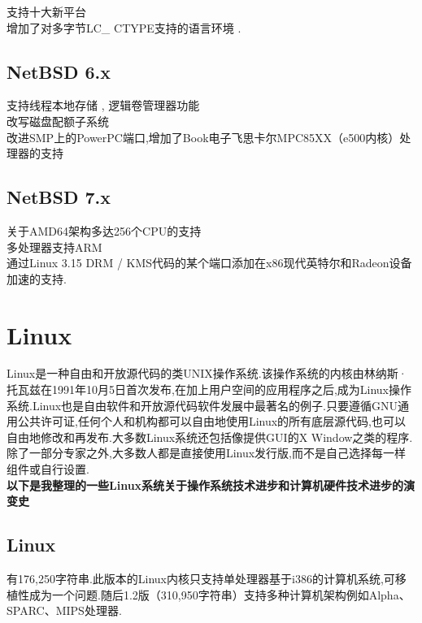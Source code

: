 \documentclass[a4paper,12pt,notitlepage]{article}
\begin{document}
	支持十大新平台 \\
	
	增加了对多字节LC\_ CTYPE支持的语言环境 . \\

\subsection{NetBSD 6.x}

	支持线程本地存储 , 逻辑卷管理器功能 \\

	改写磁盘配额子系统 \\
	
	改进SMP上的PowerPC端口,增加了Book电子飞思卡尔MPC85XX（e500内核）处理器的支持 \\	
	
\subsection{NetBSD 7.x}

	关于AMD64架构多达256个CPU的支持 \\
	
	多处理器支持ARM \\
	
	通过Linux 3.15 DRM / KMS代码的某个端口添加在x86现代英特尔和Radeon设备加速的支持. \\


\section{Linux}

	Linux是一种自由和开放源代码的类UNIX操作系统.该操作系统的内核由林纳斯·托瓦兹在1991年10月5日首次发布,在加上用户空间的应用程序之后,成为Linux操作系统.Linux也是自由软件和开放源代码软件发展中最著名的例子.只要遵循GNU通用公共许可证,任何个人和机构都可以自由地使用Linux的所有底层源代码,也可以自由地修改和再发布.大多数Linux系统还包括像提供GUI的X Window之类的程序.除了一部分专家之外,大多数人都是直接使用Linux发行版,而不是自己选择每一样组件或自行设置. \\
	
	\textbf{以下是我整理的一些Linux系统关于操作系统技术进步和计算机硬件技术进步的演变史} \\
	
\subsection{Linux}
			
	有176,250字符串.此版本的Linux内核只支持单处理器基于i386的计算机系统,可移植性成为一个问题.随后1.2版（310,950字符串）支持多种计算机架构例如Alpha、SPARC、MIPS处理器. \\
		
\end{document}
